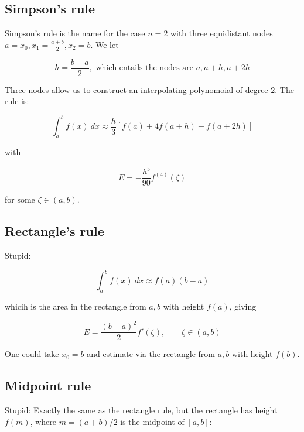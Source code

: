 \documentclass[12pt]{article}
\theoremstyle{definition}
\begin{document}
\subsection{Simpson's rule}

Simpson's rule is the name for the case $n = 2$ with three
equidistant nodes $a = x_0, x_1 = \frac{a+b}{2}, x_2 = b$. 
We let 

\begin{equation*}
    h = \frac{b-a}{2}, \text{   which entails the nodes are   }  a, a +h, a + 2h
\end{equation*}

Three nodes allow us to construct an interpolating polynomoial of degree $2$.
The rule is: 

\begin{equation*}
    \int_a^b f(x) ~ dx \approx \frac{h}{3}\left[ f(a) + 4f\left( a + h \right) +
    f(a + 2h)\right] 
\end{equation*}

with 

\begin{equation*}
    E = -\frac{h^5}{90} f^{(4)}(\zeta)
\end{equation*}

for some $\zeta \in (a, b)$.

\subsection{Rectangle's rule}

Stupid: 

\begin{equation*}
    \int_a^b f(x) ~ dx \approx f(a)(b-a)
\end{equation*}

whicih is the area in the rectangle from $a, b$ with height $f(a)$, giving 

\begin{equation*}
    E = \frac{(b-a)^2}{2}f'(\zeta), \qquad \zeta\in (a, b)
\end{equation*}

One could take $x_0 = b$ and estimate via the rectangle from $a, b$ with height
$f(b)$.


\subsection{Midpoint rule}

Stupid: Exactly the same as the rectangle rule, but the rectangle has height
$f(m)$, where $m = (a+b) / 2$ is the midpoint of $[a, b]$: 
\end{document}
